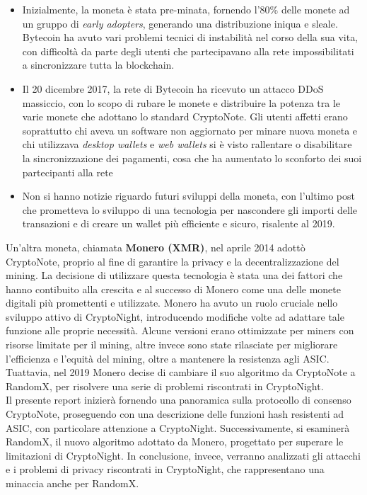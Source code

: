 \begin{itemize}
  \item Inizialmente, la moneta è stata pre-minata,
  fornendo l'80\% delle monete ad un gruppo di \emph{early adopters},
  generando una distribuzione iniqua e sleale. Bytecoin ha avuto vari
  problemi tecnici di instabilità nel corso della sua vita, con difficoltà
  da parte degli utenti che partecipavano alla rete impossibilitati a
  sincronizzare tutta la blockchain.

  \item Il 20 dicembre 2017, la rete di
  Bytecoin ha ricevuto un attacco DDoS massiccio, con lo scopo di rubare
  le monete e distribuire la potenza tra le varie monete che adottano lo
  standard CryptoNote. Gli utenti affetti erano soprattutto chi aveva un
  software non aggiornato per minare nuova moneta e chi utilizzava
  \emph{desktop wallets} e \emph{web wallets} si è visto rallentare o
  disabilitare la sincronizzazione dei pagamenti, cosa che ha aumentato lo
  sconforto dei suoi partecipanti alla rete

  \item  Non si hanno notizie
  riguardo futuri sviluppi della moneta, con l'ultimo post che prometteva
  lo sviluppo di una tecnologia per nascondere gli importi delle
  transazioni e di creare un wallet più efficiente e sicuro, risalente al
  2019.
\end{itemize}

Un'altra moneta, chiamata \textbf{Monero (XMR)}, nel aprile 2014 adottò
CryptoNote, proprio al fine di garantire la privacy e la decentralizzazione del
mining. La decisione di utilizzare questa tecnologia è stata una dei
fattori che hanno contibuito alla crescita e al
successo di Monero come una delle monete digitali più promettenti e
utilizzate. 
Monero ha avuto un ruolo cruciale nello sviluppo attivo di
CryptoNight, introducendo modifiche volte ad adattare tale funzione alle proprie necessità. 
Alcune versioni erano ottimizzate per miners con risorse limitate per il mining, altre invece sono
state rilasciate per migliorare l'efficienza e l'equità del mining,
oltre a mantenere la resistenza agli ASIC. Tuattavia, nel 2019
Monero decise di cambiare il suo algoritmo da CryptoNote a RandomX, per risolvere una serie
di problemi riscontrati in CryptoNight. \\

Il presente report inizierà fornendo una panoramica sulla protocollo di consenso CryptoNote, 
proseguendo con una descrizione delle funzioni hash resistenti ad ASIC, con particolare attenzione a CryptoNight. 
Successivamente, si esaminerà RandomX, il nuovo algoritmo adottato da Monero, progettato per superare le limitazioni di CryptoNight.
In conclusione, invece, verranno analizzati gli attacchi e i problemi di privacy riscontrati in CryptoNight, 
che rappresentano una minaccia anche per RandomX.


